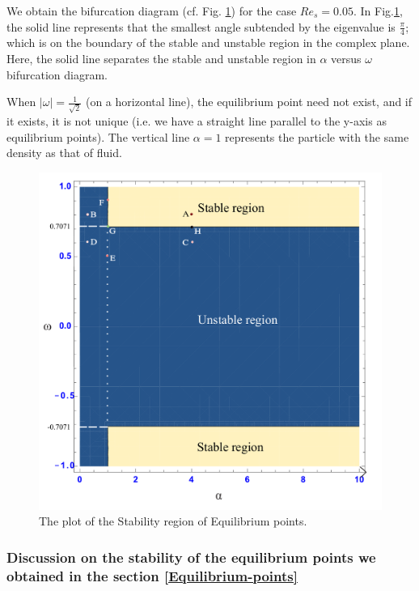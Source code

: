 \documentclass[pdflatex,sn-mathphys]{sn-jnl}%
\theoremstyle{thmstyleone}%
\theoremstyle{thmstyletwo}%
\theoremstyle{thmstylethree}%
\begin{document}
We obtain the bifurcation diagram (cf. Fig. \ref{fig:Bifurcation a vs w}) for the case $Re_s=0.05$. In Fig.\ref{fig:Bifurcation a vs w}, the solid line represents that the smallest angle subtended by the eigenvalue is $\frac{\pi}{4}$; which is on the boundary of the stable and unstable region in the complex plane.  Here, the solid line separates the stable and unstable region in $\alpha$ versus $\omega$ bifurcation diagram.

When $\vert \omega\vert=\frac{1}{\sqrt{2}}$ (on a horizontal line), the equilibrium point need not exist, and if it exists, it is not unique (i.e. we have a straight line parallel to the y-axis as equilibrium points). The vertical line $\alpha=1$ represents the particle with the same density as that of fluid.

\begin{figure}[h] 
\centering   
\includegraphics[width=1.0\textwidth]{Bifurcationavsw}
\caption[Bifurcation diagram a vs w]{The plot of the Stability region of Equilibrium points.}
\label{fig:Bifurcation a vs w}
\end{figure}

\subsubsection{Discussion on the stability of the equilibrium points we obtained in the section \ref{Equilibrium-points}}\label{Discussion on the stability of the equilibrium points we obtained in the section}
\end{document}
